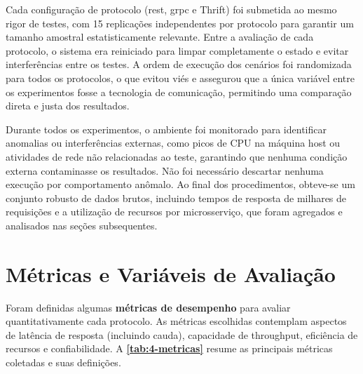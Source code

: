 Cada configuração de protocolo (\gls{rest}, \gls{grpc} e Thrift) foi submetida ao mesmo rigor de testes, com 15 replicações independentes por protocolo para garantir um tamanho amostral estatisticamente relevante. Entre a avaliação de cada protocolo, o sistema era reiniciado para limpar completamente o estado e evitar interferências entre os testes. A ordem de execução dos cenários foi randomizada para todos os protocolos, o que evitou viés e assegurou que a única variável entre os experimentos fosse a tecnologia de comunicação, permitindo uma comparação direta e justa dos resultados.

Durante todos os experimentos, o ambiente foi monitorado para identificar anomalias ou interferências externas, como picos de CPU na máquina host ou atividades de rede não relacionadas ao teste, garantindo que nenhuma condição externa contaminasse os resultados. Não foi necessário descartar nenhuma execução por comportamento anômalo. Ao final dos procedimentos, obteve-se um conjunto robusto de dados brutos, incluindo tempos de resposta de milhares de requisições e a utilização de recursos por microsserviço, que foram agregados e analisados nas seções subsequentes.

\section{Métricas e Variáveis de Avaliação}
\label{sec:5-metricas-variaveis}

Foram definidas algumas \textbf{métricas de desempenho} para avaliar quantitativamente cada protocolo. As métricas escolhidas contemplam aspectos de latência de resposta (incluindo cauda), capacidade de throughput, eficiência de recursos e confiabilidade. A \textbf{\autoref{tab:4-metricas}} resume as principais métricas coletadas e suas definições.

